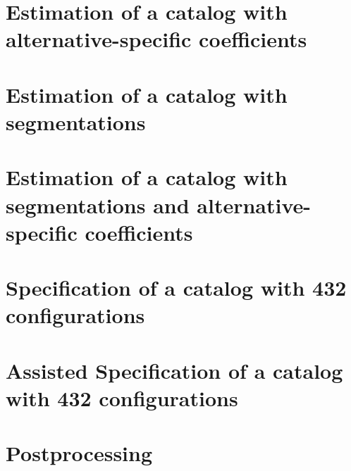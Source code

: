\documentclass[12pt,a4paper]{article}
\newcommand*{\examplesPath}{../../examples}
\begin{document}


\section{Estimation of a catalog with alternative-specific coefficients}\label{sec:b03alt_spec}



\section{Estimation of a catalog with segmentations}\label{sec:b04segmentation}



\section{Estimation of a catalog with segmentations and alternative-specific coefficients}\label{sec:b05alt_spec_segmentation}



\section{Specification of a catalog with 432 configurations}\label{sec:everything_spec}



\section{Assisted Specification of a catalog with 432 configurations}\label{sec:b07everything_assisted}



\section{Postprocessing}\label{sec:b09post_processing}


\end{document}
